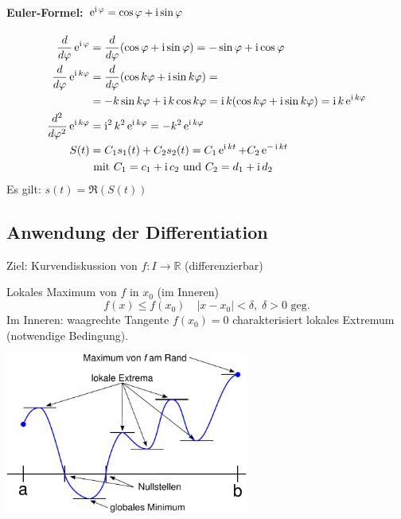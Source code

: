 \paragraph{Euler-Formel: $\operatorname{e}^{\operatorname{i}\varphi} = \cos \varphi + \operatorname{i} \sin \varphi$}
\begin{align*}
	\frac{d}{d\varphi}\operatorname{e}^{\operatorname{i}\varphi} &= \frac{d}{d\varphi}(\cos \varphi + \operatorname{i} \sin \varphi) = -\sin \varphi + \operatorname{i}\cos \varphi \\
	\frac{d}{d\varphi}\operatorname{e}^{\operatorname{i} k\varphi} &= \frac{d}{d\varphi}(\cos k\varphi + \operatorname{i} \sin k\varphi) =\\ &= -k\sin k\varphi + \operatorname{i} k\cos k\varphi = \operatorname{i} k(\cos k\varphi + \operatorname{i}\sin k\varphi) = \operatorname{i} k\operatorname{e}^{\operatorname{i} k\varphi} \\
	\frac{d^2}{d\varphi^2}\operatorname{e}^{\operatorname{i} k\varphi} &= \operatorname{i}^2k^2\operatorname{e}^{\operatorname{i} k\varphi} = -k^2 \operatorname{e}^{\operatorname{i} k\varphi} \\
	S(t) &= C_1s_1(t) + C_2s_2(t) = C_1\operatorname{e}^{\operatorname{i} kt} + C_2\operatorname{e}^{-\operatorname{i} kt} \\&\text{ mit $C_1 = c_1 + \operatorname{i} c_2$ und $C_2 = d_1 + \operatorname{i} d_2$}
\end{align*}
Es gilt: $s(t) = \Re(S(t))$

\subsection{Anwendung der Differentiation}
Ziel: Kurvendiskussion von $f: I \rightarrow \mathbb{R}$ (differenzierbar)
\begin{definition}
	Lokales Maximum von $f$ in $x_0$ (im Inneren)
	\begin{equation*}
		f(x) \leq f(x_0) \quad |x - x_0| < \delta,\;\delta>0\text{ geg.}
	\end{equation*}
	Im Inneren: waagrechte Tangente $f(x_0) = 0$ charakterisiert lokales Extremum (notwendige Bedingung).
\end{definition}

\begin{center}
	\includegraphics[width=0.6\textwidth]{include/20091201-1.pdf}
\end{center}

